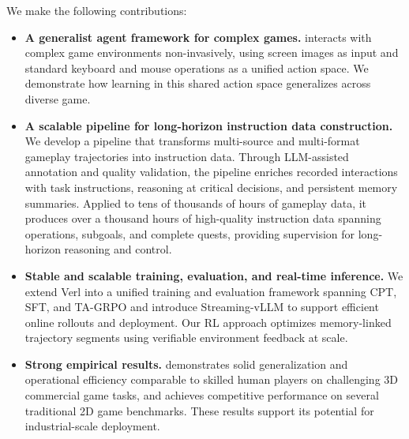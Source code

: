 We make the following contributions:
\begin{itemize}
    \item \textbf{A generalist agent framework for complex games.}
    \ourmodel interacts with complex game environments non-invasively, using screen images as input and standard keyboard and mouse operations as a unified action space. We demonstrate how learning in this shared action space generalizes across diverse game.

    \item \textbf{A scalable pipeline for long-horizon instruction data construction.}
    We develop a pipeline that transforms multi-source and multi-format gameplay trajectories into instruction data. Through LLM-assisted annotation and quality validation, the pipeline enriches recorded interactions with task instructions, reasoning at critical decisions, and persistent memory summaries. Applied to tens of thousands of hours of gameplay data, it produces over a thousand hours of high-quality instruction data spanning operations, subgoals, and complete quests, providing supervision for long-horizon reasoning and control.

    \item \textbf{Stable and scalable training, evaluation, and real-time inference.}
    We extend Verl into a unified training and evaluation framework spanning CPT, SFT, and TA-GRPO and introduce Streaming-vLLM to support efficient online rollouts and deployment. Our RL approach optimizes memory-linked trajectory segments using verifiable environment feedback at scale.

    \item \textbf{Strong empirical results.}
    \ourmodel demonstrates solid generalization and operational efficiency comparable to skilled human players on challenging 3D commercial game tasks, and achieves competitive performance on several traditional 2D game benchmarks. These results support its potential for industrial-scale deployment.
\end{itemize}